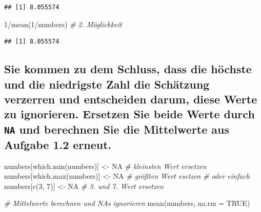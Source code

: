 \documentclass[12pt,a4paper]{article}
\newenvironment{Shaded}{\begin{snugshade}}{\end{snugshade}}
\newcommand{\AttributeTok}[1]{\textcolor[rgb]{0.77,0.63,0.00}{#1}}
\newcommand{\CommentTok}[1]{\textcolor[rgb]{0.56,0.35,0.01}{\textit{#1}}}
\newcommand{\ConstantTok}[1]{\textcolor[rgb]{0.00,0.00,0.00}{#1}}
\newcommand{\DecValTok}[1]{\textcolor[rgb]{0.00,0.00,0.81}{#1}}
\newcommand{\FunctionTok}[1]{\textcolor[rgb]{0.00,0.00,0.00}{#1}}
\newcommand{\NormalTok}[1]{#1}
\newcommand{\OtherTok}[1]{\textcolor[rgb]{0.56,0.35,0.01}{#1}}
\newcommand{\SpecialCharTok}[1]{\textcolor[rgb]{0.00,0.00,0.00}{#1}}
\begin{document}
\begin{verbatim}
## [1] 8.055574
\end{verbatim}

\begin{Shaded}
\begin{Highlighting}[]
    \DecValTok{1}\SpecialCharTok{/}\FunctionTok{mean}\NormalTok{(}\DecValTok{1}\SpecialCharTok{/}\NormalTok{numbers)                       }\CommentTok{\# 2. Möglichkeit}
\end{Highlighting}
\end{Shaded}

\begin{verbatim}
## [1] 8.055574
\end{verbatim}

\vspace{0.5cm}

\hypertarget{sie-kommen-zu-dem-schluss-dass-die-huxf6chste-und-die-niedrigste-zahl-die-schuxe4tzung-verzerren-und-entscheiden-darum-diese-werte-zu-ignorieren.-ersetzen-sie-beide-werte-durch-und-berechnen-sie-die-mittelwerte-aus-aufgabe-1.2-erneut.}{%
\subsection{\texorpdfstring{Sie kommen zu dem Schluss, dass die höchste
und die niedrigste Zahl die Schätzung verzerren und entscheiden darum,
diese Werte zu ignorieren. Ersetzen Sie beide Werte durch \texttt{NA}
und berechnen Sie die Mittelwerte aus Aufgabe 1.2
erneut.}{Sie kommen zu dem Schluss, dass die höchste und die niedrigste Zahl die Schätzung verzerren und entscheiden darum, diese Werte zu ignorieren. Ersetzen Sie beide Werte durch  und berechnen Sie die Mittelwerte aus Aufgabe 1.2 erneut.}}\label{sie-kommen-zu-dem-schluss-dass-die-huxf6chste-und-die-niedrigste-zahl-die-schuxe4tzung-verzerren-und-entscheiden-darum-diese-werte-zu-ignorieren.-ersetzen-sie-beide-werte-durch-und-berechnen-sie-die-mittelwerte-aus-aufgabe-1.2-erneut.}}

\begin{Shaded}
\begin{Highlighting}[]
\NormalTok{    numbers[}\FunctionTok{which.min}\NormalTok{(numbers)] }\OtherTok{\textless{}{-}} \ConstantTok{NA}     \CommentTok{\# kleinsten Wert ersetzen}
\NormalTok{    numbers[}\FunctionTok{which.max}\NormalTok{(numbers)] }\OtherTok{\textless{}{-}} \ConstantTok{NA}     \CommentTok{\# größten Wert esetzen }
    \CommentTok{\# oder einfach }
\NormalTok{    numbers[}\FunctionTok{c}\NormalTok{(}\DecValTok{3}\NormalTok{, }\DecValTok{7}\NormalTok{)] }\OtherTok{\textless{}{-}} \ConstantTok{NA}                \CommentTok{\# 3. und 7. Wert ersetzen }
    
    \CommentTok{\# Mittelwerte berechnen und \textquotesingle{}NA\textquotesingle{}s ignorieren}
    \FunctionTok{mean}\NormalTok{(numbers, }\AttributeTok{na.rm =} \ConstantTok{TRUE}\NormalTok{)}
\end{Highlighting}
\end{Shaded}
\end{document}
